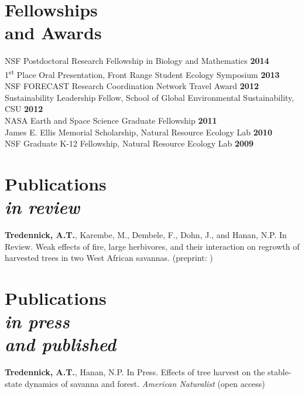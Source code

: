 \documentclass[margin,line]{resume}
\begin{document}
\begin{resume}
    \section{\mysidestyle Fellowships \\and Awards} 
                NSF Postdoctoral Research Fellowship in Biology and Mathematics    \hfill \textbf{2014}\vspace{.5mm}\\%
                1\textsuperscript{st} Place Oral Presentation, Front Range Student Ecology Symposium  \hfill \textbf{2013}\vspace{.5mm}\\%
                NSF FORECAST Research Coordination Network Travel Award \hfill \textbf{2012}\vspace{.5mm}\\%
                Sustainability Leadership Fellow, School of Global Environmental Sustainability, CSU \hfill \textbf{2012}\vspace{.5mm}\\%
		NASA Earth and Space Science Graduate Fellowship  \hfill \textbf{2011}\vspace{.5mm}\\%
		James E. Ellis Memorial Scholarship, Natural Resource Ecology Lab  \hfill \textbf{2010}\vspace{.5mm}\\%
		NSF Graduate K-12 Fellowship, Natural Resource Ecology Lab                        \hfill\textbf{2009}%
   
     \section{\mysidestyle Publications\\ \textsl{\footnotesize in review}}
        \textbf{Tredennick, A.T.}, Karembe, M., Dembele, F., Dohn, J., and Hanan, N.P. In Review. Weak effects of fire, large herbivores, and their interaction on regrowth of harvested trees in two West African savannas. (preprint: )
        
    \section{\mysidestyle Publications\\ \textsl{\footnotesize in press}\\ \textsl{\footnotesize and published}}     
     	\textbf{Tredennick, A.T.}, Hanan, N.P. In Press. Effects of tree harvest on the stable-state dynamics of savanna and forest. \textsl{American Naturalist} (open access) \vspace{-6mm} \\%
	

\end{resume}
\end{document}
